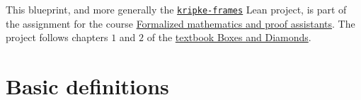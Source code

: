 
%

%

\begin{abstract}
    We outline a plan of formalization for Kripke frames, define the modal operators $\square$, $\diamond$ and characterise some of the most relevant modal logic axioms, syntax, Boolean algebra structure, semantic soundness. Time permitting, we will formalize some examples.
  \end{abstract}
  
  
  This blueprint, and more generally the \href{https://github.com/MatejJazbec/kripke-frames}{\texttt{kripke-frames}} Lean project, is part of the assignment for the course \href{https://www.andrej.com/zapiski/MAT-FORMATH-2024/book/}{Formalized mathematics and proof assistants}.
  The project follows chapters $1$ and $2$ of the \href{https://bd.openlogicproject.org/}{textbook Boxes and Diamonds}.
  
  \section{Basic definitions}

